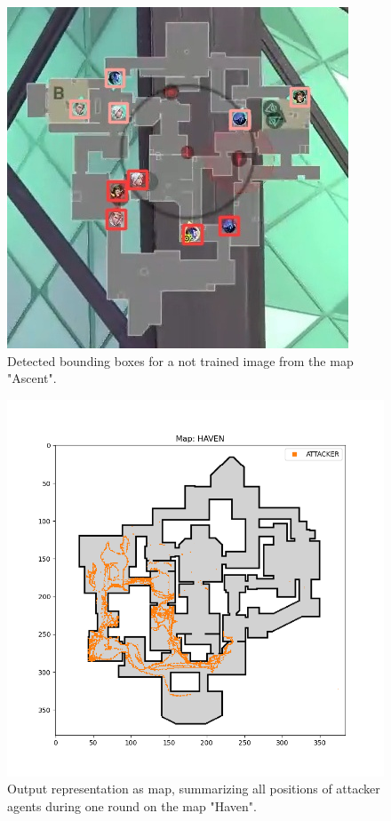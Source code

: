 \begin{figure}[H]
	\centering
	\includegraphics[width=0.8\linewidth]{images/a02-detect}
	\caption[Detected bounding boxes.]{Detected bounding boxes for a not trained image from the map "Ascent".}
	\label{fig:ea:outDetect}
\end{figure}

\begin{figure}[H]
	\centering
	\includegraphics[width=0.95\linewidth]{images/a03-att-output}
	\caption[Output representation as map for attacker.]{Output representation as map, summarizing all positions 
		of attacker agents during one round on the map "Haven".}
	\label{fig:ea:outputAtt}
\end{figure}

